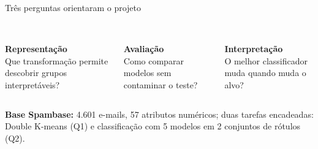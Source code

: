 \documentclass[aspectratio=169,11pt]{beamer}
\begin{document}
\begin{frame}[t]{Três perguntas orientaram o projeto}
\vspace{1mm}
\begin{columns}[T,onlytextwidth]
\begin{simplebox}
\\[1mm]
\textbf{Representação}\\[2mm]
\small Que transformação permite descobrir grupos interpretáveis?
\end{simplebox}
\begin{simplebox}
\\[1mm]
\textbf{Avaliação}\\[2mm]
\small Como comparar modelos sem contaminar o teste?
\end{simplebox}
\begin{simplebox}
\\[1mm]
\textbf{Interpretação}\\[2mm]
\small O melhor classificador muda quando muda o alvo?
\end{simplebox}
\end{columns}
\vspace{3mm}
\begin{notabox}
\small \textbf{Base Spambase:} 4.601 e-mails, 57 atributos numéricos; duas tarefas encadeadas:
Double K-means (Q1) e classificação com 5 modelos em 2 conjuntos de rótulos (Q2).
\end{notabox}
\end{frame}
\end{document}
